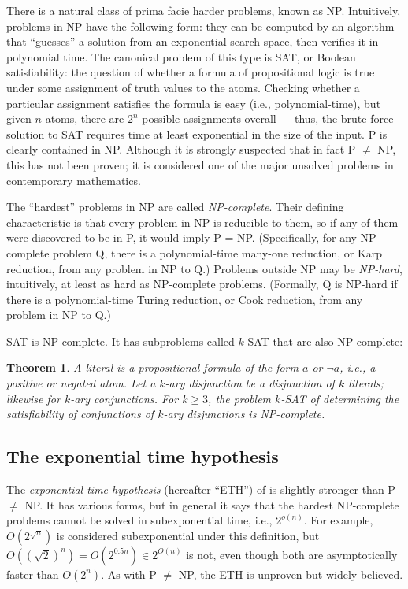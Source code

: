 \documentclass[letterpaper,12pt]{article}
\newtheorem{theorem}{Theorem}
\begin{document}
There is a natural class of prima facie harder problems, known as NP. Intuitively, problems in NP have the following form: they can be computed by an algorithm that ``guesses'' a solution from an exponential search space, then verifies it in polynomial time. The canonical problem of this type is SAT, or Boolean satisfiability: the question of whether a formula of propositional logic is true under some assignment of truth values to the atoms. Checking whether a particular assignment satisfies the formula is easy (i.e., polynomial-time), but given $n$ atoms, there are $2^n$ possible assignments overall --- thus, the brute-force solution to SAT requires time at least exponential in the size of the input. P is clearly contained in NP. Although it is strongly suspected that in fact P $\not =$ NP, this has not been proven; it is considered one of the major unsolved problems in contemporary mathematics.

The ``hardest'' problems in NP are called \emph{NP-complete}. Their defining characteristic is that every problem in NP is reducible to them, so if any of them were discovered to be in P, it would imply P = NP. (Specifically, for any NP-complete problem Q, there is a polynomial-time many-one reduction, or Karp reduction, from any problem in NP to Q.) Problems outside NP may be \emph{NP-hard}, intuitively, at least as hard as NP-complete problems. (Formally, Q is NP-hard if there is a polynomial-time Turing reduction, or Cook reduction, from any problem in NP to Q.)

SAT is NP-complete. It has subproblems called $k$-SAT that are also NP-complete:
\begin{theorem}
\label{kSat}
A \emph{literal} is a propositional formula of the form $a$ or $\neg a$, i.e., a positive or negated atom. Let a \emph{$k$-ary disjunction} be a disjunction of $k$ literals; likewise for \emph{$k$-ary conjunctions}. For $k \geq 3$, the problem $k$-SAT of determining the satisfiability of conjunctions of $k$-ary disjunctions is NP-complete.
\end{theorem}

\subsection{The exponential time hypothesis}
The \emph{exponential time hypothesis} (hereafter ``ETH'') of \cite{DBLP:journals/jcss/ImpagliazzoP01} is slightly stronger than P $\not =$ NP. It has various forms, but in general it says that the hardest NP-complete problems cannot be solved in subexponential time, i.e., $2^{o(n)}$. For example, $O(2^{\sqrt{n}})$ is considered subexponential under this definition, but $O((\sqrt{2})^n) = O(2^{0.5n}) \in 2^{O(n)}$ is not, even though both are asymptotically faster than $O(2^n)$. As with P $\not =$ NP, the ETH is unproven but widely believed.
\end{document}
